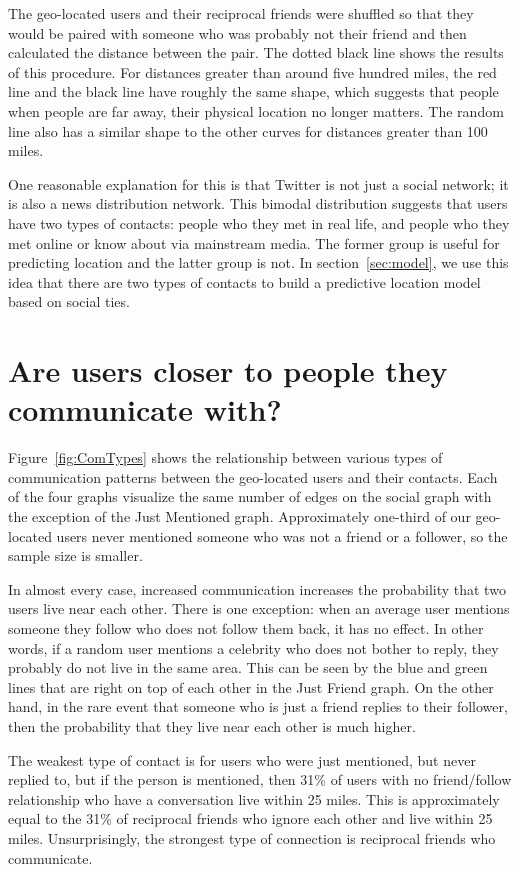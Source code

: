 The geo-located users and their reciprocal friends were shuffled so that they
would be paired with someone who was probably not their friend and then
calculated the distance between the pair.
The dotted black line shows the results of this procedure.
For distances greater than around five
hundred miles, the red line and the black line have roughly the same shape,
which suggests that people when people are far away, their physical location no
longer matters.
The random line also has a similar shape to the other curves for distances
greater than 100 miles.

One reasonable explanation for this is that Twitter is not just a social
network; it is also a news distribution network.  This bimodal distribution
suggests that users have two types of contacts: people who they met in
real life, and people who they met online or know about via mainstream media.
The former group is useful for predicting location and the latter group is not.
In section~\ref{sec:model}, we use this idea that there are two types of
contacts to build a predictive location model based on social ties.


\section{Are users closer to people they communicate with?}

Figure~\ref{fig:ComTypes} shows the relationship between various types of
communication patterns between the geo-located users and their contacts.
Each of the four graphs visualize the same number of edges on the social graph
with the exception of the Just Mentioned graph. Approximately one-third of our
geo-located users never mentioned someone who was not a friend or a follower,
so the sample size is smaller.

In almost every case, increased communication increases the probability that
two users live near each other.
There is one exception: when an average user mentions someone they follow who
does not follow them back, it has no effect.
In other words, if a random user mentions a celebrity who does not bother to
reply, they probably do not live in the same area. This can be seen by the blue
and green lines that are right on top of each other in the Just Friend graph.
On the other hand, in the rare event that someone who is just a friend replies
to their follower, then the probability that they live near each other is much
higher.

The weakest type of contact is for users who were just mentioned, but never
replied to, but if the person is mentioned, then 31\% of users with no
friend/follow relationship who have a conversation live within 25 miles.
This is approximately equal to the 31\% of reciprocal friends who ignore each
other and live within 25 miles.
Unsurprisingly, the strongest type of connection is reciprocal friends who
communicate.


